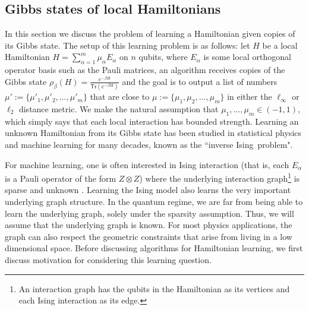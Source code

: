 \documentclass[11pt]{article}
\newcommand{\Tr}{\textsf{Tr}}
\begin{document}


\subsection{Gibbs states of local Hamiltonians}
In this section we discuss the problem of learning a Hamiltonian given copies of its Gibbs state. The setup of this learning problem is as follows: let $H$ be a local Hamiltonian $H=\sum_{\alpha=1}^m\mu_\alpha E_\alpha$ on $n$ qubits, where $E_\alpha$ is some local orthogonal operator basis such as the Pauli matrices, an algorithm receives copies of the Gibbs state $\rho_\beta(H) = \frac{e^{-\beta H}}{\Tr(e^{-\beta H})}$ and the goal is to  output a list of numbers $\mu':=\{\mu'_1, \mu'_2, \ldots ,\mu'_m\}$ that are close to $\mu:=\{\mu_1, \mu_2, \ldots ,\mu_m\}$ in either the $\ell_\infty$ or $\ell_2$ distance metric. We make the natural assumption that $\mu_1,\ldots ,\mu_m \in (-1,1)$, which simply says that each local interaction has bounded strength. Learning an unknown Hamiltonian from its Gibbs state has been studied in statistical physics and machine learning \cite{ChowLiu1968, hinton1986learning, Tanaka1998,Albert201499} for many decades,  known as the ``inverse Ising~problem". 

For machine learning, one is often interested in Ising interaction (that is, each $E_\alpha$ is a Pauli operator of the form $Z\otimes Z$) where the underlying interaction graph\footnote{An interaction graph has the qubits in the Hamiltonian as its vertices and each Ising interaction as its edge.} is sparse and unknown \cite{Bresler_learning, Interaction_screening, Klivans_learning}. Learning the Ising model also learns the very important underlying graph structure. In the quantum regime, we are far from being able to learn the underlying graph, solely under the sparsity assumption. Thus, we will assume that the underlying graph is known. For most physics applications, the graph can also respect the geometric constraints that arise from living in a low dimensional space. Before discussing algorithms for Hamiltonian learning, we first discuss motivation for considering this learning question. 
\end{document}
